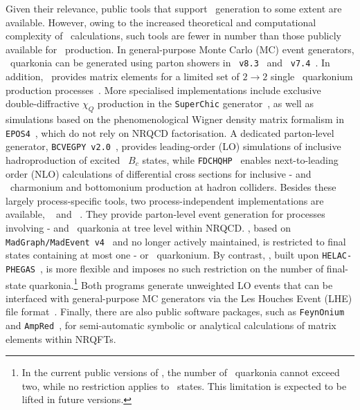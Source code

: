 Given their relevance, public tools that support \pwavetxt\ generation to some extent are available. However, owing to the increased theoretical and computational complexity of \pwavetxt\ calculations, such tools are fewer in number than those publicly available for \swavetxt\ production. In general-purpose Monte Carlo (MC) event generators, \pwavetxt\ quarkonia can be generated using parton showers in \pythia~{\tt v8.3}~\cite{Cooke:2023ldt} and \herwig~{\tt v7.4}~\cite{Masouminia:2025kec}. In addition, \pythia\ provides matrix elements for a limited set of $2\to 2$ single \pwavetxt\ quarkonium production processes~\cite{Sjostrand:2000wi,Sjostrand:2006za,Sjostrand:2007gs,Sjostrand:2014zea,Bierlich:2022pfr}. 
More specialised implementations include exclusive double-diffractive $\chi_{Q}$ production in the \texttt{SuperChic} generator~\cite{Khoze:2000jm,Harland-Lang:2009kjv}, as well as simulations based on the phenomenological Wigner density matrix formalism in \texttt{EPOS4}~\cite{Song:2017phm,Villar:2022sbv,Zhao:2025cnp}, which do not rely on NRQCD factorisation. A dedicated parton-level generator, \texttt{BCVEGPY}~{\tt v2.0}~\cite{Chang:2005hq}, provides leading-order (LO) simulations of inclusive hadroproduction of excited \pwavetxt\ $B_c$ states, while \texttt{FDCHQHP}~\cite{Wan:2014vka} enables next-to-leading order (NLO) calculations of differential cross sections for inclusive \swave- and \pwavetxt\ charmonium and bottomonium production at hadron colliders.
Besides these largely process-specific tools, two process-independent implementations are available, \madonia~\cite{Artoisenet:2007qm} and \helaconia~\cite{Shao:2012iz,Shao:2015vga}. 
They provide parton-level event generation for processes involving \swave- and \pwavetxt\ quarkonia at tree level within NRQCD. 
\madonia, based on \texttt{MadGraph/MadEvent}~{\tt v4}~\cite{Alwall:2007st} and no longer actively maintained, is restricted to final states containing at most one \swave- or \pwavetxt\ quarkonium. By contrast, \helaconia, built upon \texttt{HELAC-PHEGAS}~\cite{Kanaki:2000ey,Papadopoulos:2000tt,Kanaki:2000ms,Papadopoulos:2006mh}, is more flexible and imposes no such restriction on the number of final-state quarkonia.\footnote{In the current public versions of \helaconia, the number of \pwavetxt\ quarkonia cannot exceed two, while no restriction applies to \swavetxt\ states. This limitation is expected to be lifted in future versions.}
Both programs generate unweighted LO events that can be interfaced with general-purpose MC generators via the Les Houches Event (LHE) file format~\cite{Alwall:2006yp}. Finally, there are also public software packages, such as {\tt FeynOnium}~\cite{Brambilla:2020fla} and {\tt AmpRed}~\cite{Chen:2024xwt}, for semi-automatic symbolic or analytical calculations of matrix elements  within NRQFTs.

